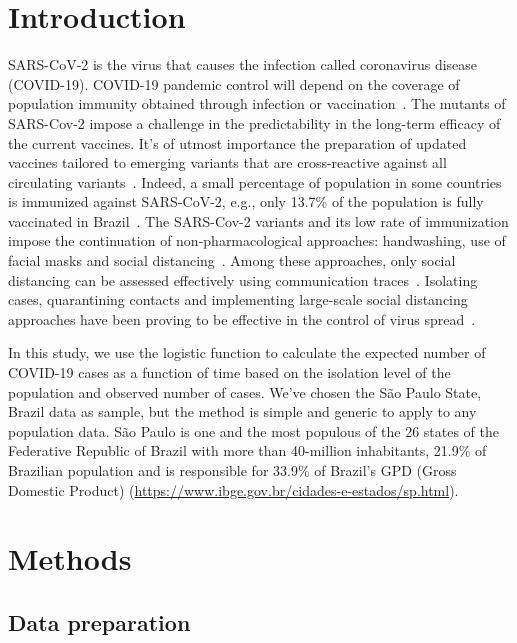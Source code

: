 \documentclass[review]{elsarticle}
\begin{document}
\linenumbers

\section{Introduction}

{SARS-CoV-2} is the virus that causes the infection 
called coronavirus disease (\hbox{COVID-19}). 
COVID-19 pandemic control will depend 
on the coverage of population immunity obtained 
through infection or vaccination~\cite{WHOa}. 
The mutants of SARS-Cov-2 impose a challenge in 
the predictability in the long-term efficacy 
of the current vaccines. 
 It's of utmost importance the preparation of updated 
 vaccines tailored to emerging variants that are cross-reactive 
 against all circulating variants~\cite{Harvey2021}. 
Indeed, a small percentage of population in some countries 
is immunized against SARS-CoV-2, 
e.g., only 13.7\% of the population                                 %
is fully vaccinated in Brazil~\cite{MH2021}.
The {SARS-Cov-2} variants and its low rate of immunization 
impose the continuation of non-pharmacological approaches: 
handwashing, use of facial masks and social distancing~\cite{WHOb}. 
Among these approaches, only social distancing 
can be assessed effectively using 
communication traces~\cite{Farrahi2014}. 
 Isolating cases, quarantining contacts and implementing
large-scale social distancing approaches have been proving to 
be effective in the control of virus spread~\cite{Aquino2020}.

In this study, we use the logistic function 
to calculate the expected number of {COVID-19} cases 
as a function of time
based 
on the isolation level of the population and 
observed number of cases. 
We've chosen the S\~{a}o Paulo State, Brazil data as sample, 
but the method is simple and generic 
to apply to any population data. 
S\~{a}o Paulo is one and the most populous of the 26 states 
of the Federative Republic of Brazil with 
more than 40-million inhabitants, 21.9\% 
of Brazilian population and is responsible for 33.9\% 
of Brazil's GPD (Gross Domestic Product) 
(\url{https://www.ibge.gov.br/cidades-e-estados/sp.html}).

\section{Methods}

\subsection{Data preparation}
\end{document}
